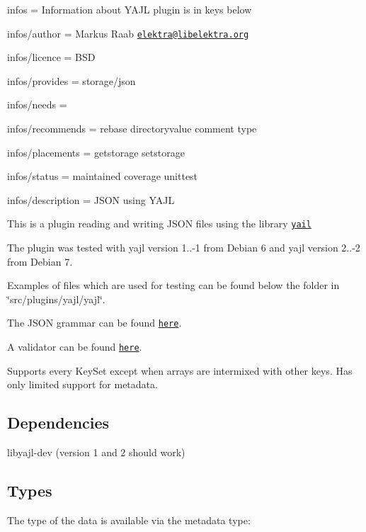 
\begin{DoxyItemize}
\item infos = Information about Y\+A\+JL plugin is in keys below
\item infos/author = Markus Raab \href{mailto:elektra@libelektra.org}{\tt elektra@libelektra.\+org}
\item infos/licence = B\+SD
\item infos/provides = storage/json
\item infos/needs =
\item infos/recommends = rebase directoryvalue comment type
\item infos/placements = getstorage setstorage
\item infos/status = maintained coverage unittest
\item infos/description = J\+S\+ON using Y\+A\+JL
\end{DoxyItemize}

This is a plugin reading and writing J\+S\+ON files using the library \href{http://lloyd.github.com/yajl/}{\tt yail}

The plugin was tested with yajl version 1..-\/1 from Debian 6 and yajl version 2..-\/2 from Debian 7.

Examples of files which are used for testing can be found below the folder in \char`\"{}src/plugins/yajl/yajl\char`\"{}.

The J\+S\+ON grammar can be found \href{http://www.ietf.org/rfc/rfc4627.txt}{\tt here}.

A validator can be found \href{http://jsonlint.com/}{\tt here}.

Supports every Key\+Set except when arrays are intermixed with other keys. Has only limited support for metadata.

\subsection*{Dependencies}


\begin{DoxyItemize}
\item {\ttfamily libyajl-\/dev} (version 1 and 2 should work)
\end{DoxyItemize}

\subsection*{Types}

The type of the data is available via the metadata {\ttfamily type}\+:


